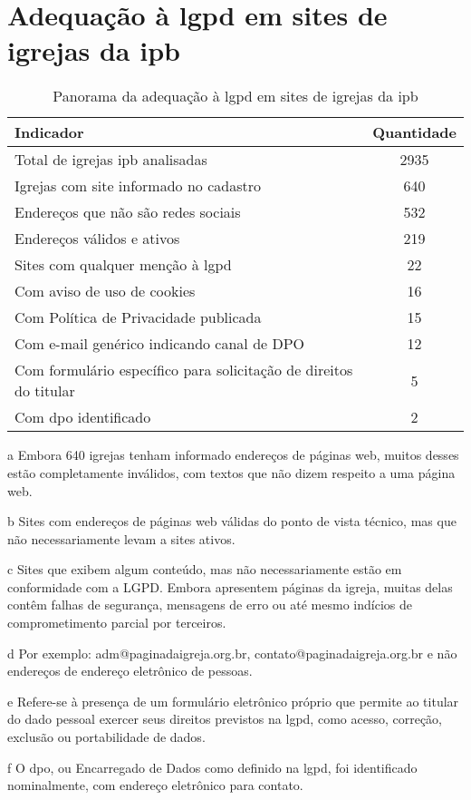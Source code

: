 \chapter{Adequação à \gls{lgpd} em sites de igrejas da \gls{ipb}}
\label{apendice:adequacao_sites}

\begin{table}[H]
\centering
\begin{threeparttable}
\caption{Panorama da adequação à \gls{lgpd} em sites de igrejas da \gls{ipb}}
\label{tabela:panorama_adequacao_ipb}
\begin{tabularx}{\textwidth}{>{\raggedright\arraybackslash}X c}
\toprule
\textbf{Indicador} & \textbf{Quantidade} \\
\midrule
Total de igrejas \gls{ipb} analisadas & 2935 \\
Igrejas com site informado no cadastro\tnote{a} & 640 \\
Endereços que não são redes sociais\tnote{b} & 532 \\
Endereços válidos e ativos\tnote{c} & 219 \\
Sites com qualquer menção à \gls{lgpd} & 22 \\
Com aviso de uso de cookies & 16 \\
Com Política de Privacidade publicada & 15 \\
Com e-mail genérico indicando canal de DPO\tnote{d} & 12 \\
Com formulário específico para solicitação de direitos do titular\tnote{e} & 5 \\
Com \gls{dpo} identificado\tnote{f} & 2 \\
\bottomrule
\end{tabularx}
\begin{tablenotes}
\footnotesize
\item[a] Embora 640 igrejas tenham informado endereços de páginas web, muitos desses estão completamente inválidos, com textos que não dizem respeito a uma página web.
\item[b] Sites com endereços de páginas web válidas do ponto de vista técnico, mas que não necessariamente levam a sites ativos.
\item[c] Sites que exibem algum conteúdo, mas não necessariamente estão em conformidade com a LGPD. Embora apresentem páginas da igreja, muitas delas contêm falhas de segurança, mensagens de erro ou até mesmo indícios de comprometimento parcial por terceiros.
\item[d] Por exemplo: adm@paginadaigreja.org.br, contato@paginadaigreja.org.br e não endereços de endereço eletrônico de pessoas.
\item[e] Refere-se à presença de um formulário eletrônico próprio que permite ao titular do dado pessoal exercer seus direitos previstos na \gls{lgpd}, como acesso, correção, exclusão ou portabilidade de dados.
\item[f] O \gls{dpo}, ou Encarregado de Dados como definido na \gls{lgpd}, foi identificado nominalmente, com endereço eletrônico para contato.
\end{tablenotes}
\end{threeparttable}
\end{table}